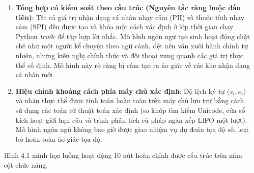 \documentclass[
  11pt,
  a4paper,
]{article}
\providecommand{\tightlist}{%
  \setlength{\itemsep}{0pt}\setlength{\parskip}{0pt}}
\begin{document}
\begin{enumerate}
\def\labelenumi{\arabic{enumi}.}
\tightlist
\item
  \textbf{Tổng hợp có kiểm soát theo cấu trúc (Nguyên tắc ràng buộc đầu
  tiên)}: Tất cả giá trị nhận dạng cá nhân nhạy cảm (\(\text{PII}\)) và
  thuộc tính nhạy cảm (\(\text{SPI}\)) đều được tạo và khóa một cách xác
  định ở lớp thời gian chạy Python \emph{trước} để tập hợp lời nhắc. Mô
  hình ngôn ngữ tạo sinh hoạt động chặt chẽ như một người kể chuyện theo
  ngữ cảnh, dệt nên văn xuôi hành chính tự nhiên, những kiến
  \hspace{0pt}\hspace{0pt}nghị chính thức và đối thoại xung quanh các
  giá trị thực thể cố định. Mô hình này rõ ràng bị cấm tạo ra ảo giác về
  các khe nhận dạng cá nhân mới.
\item
  \textbf{Hiệu chỉnh khoảng cách phía máy chủ xác định}: Độ lệch ký tự
  (\(s_i, e_i\)) và nhãn thực thể được tính toán hoàn toàn trên máy chủ
  lưu trữ bằng cách sử dụng các toán tử thuật toán xác định (so khớp tìm
  kiếm Unicode, cửa sổ kích hoạt giới hạn câu và trình phân tích cú pháp
  ngăn xếp LIFO một lượt). Mô hình ngôn ngữ không bao giờ được giao
  nhiệm vụ dự đoán tọa độ số, loại bỏ hoàn toàn ảo giác tọa độ.
\end{enumerate}

Hình 4.1 minh họa luồng hoạt động 10 nút hoàn chỉnh được cấu trúc trên
năm cột chức năng.
\end{document}
